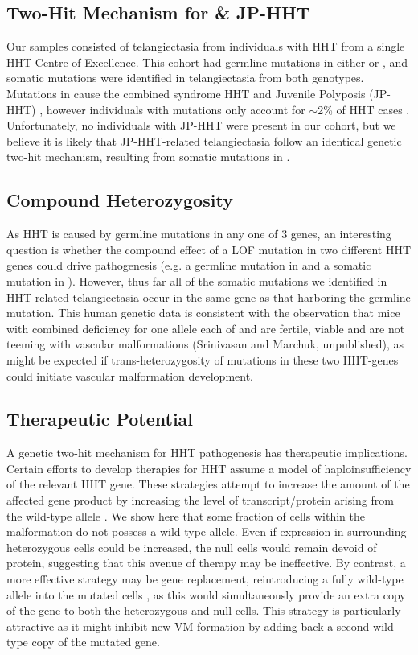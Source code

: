 \subsection{Two-Hit Mechanism for  \& JP-HHT}
Our samples consisted of telangiectasia from individuals with HHT from a single HHT Centre of Excellence.  This cohort had germline mutations in either  or , and somatic mutations were identified in telangiectasia from both genotypes. Mutations in  cause the combined syndrome HHT and Juvenile Polyposis (JP-HHT) , however individuals with  mutations only account for $\sim$2\% of HHT cases \citep{gallione2004}. Unfortunately, no individuals with JP-HHT were present in our cohort, but we believe it is likely that JP-HHT-related telangiectasia follow an identical genetic two-hit mechanism, resulting from somatic mutations in . 

\subsection{Compound Heterozygosity}
As HHT is caused by germline mutations in any one of 3 genes, an interesting question is whether the compound effect of a LOF mutation in two different HHT genes could drive pathogenesis (e.g. a germline mutation in  and a somatic mutation in ). However, thus far all of the somatic mutations we identified in HHT-related telangiectasia occur in the same gene as that harboring the germline mutation.   This human genetic data is consistent with the observation that mice with combined deficiency for one allele each of  and  are fertile, viable and are not teeming with vascular malformations \citep{eleftheriou2016} (Srinivasan and Marchuk, unpublished), as might be expected if trans-heterozygosity of mutations in these two HHT-genes could initiate vascular malformation development.
	
\subsection{Therapeutic Potential}	
A genetic two-hit mechanism for HHT pathogenesis has therapeutic implications. Certain efforts to develop therapies for HHT assume a model of haploinsufficiency of the relevant HHT gene.  These strategies attempt to increase the amount of the affected gene product by increasing the level of transcript/protein arising from the wild-type allele \citep{ruizllorente2017}. We show here that some fraction of cells within the malformation do not possess a wild-type allele.  Even if expression in surrounding heterozygous cells could be increased, the null cells would remain devoid of protein, suggesting that this avenue of therapy may be ineffective.  By contrast, a more effective strategy may be gene replacement, reintroducing a fully wild-type allele into the mutated cells \citep{seki2003}, as this would simultaneously provide an extra copy of the gene to both the heterozygous and null cells.   This strategy is particularly attractive as it might inhibit new VM formation by adding back a second wild-type copy of the mutated gene.


